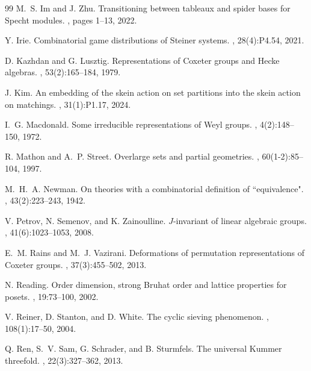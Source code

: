 \documentclass[11pt]{amsart}
\theoremstyle{plain}
\theoremstyle{definition}
\theoremstyle{remark}
\numberwithin{equation}{subsection}
\begin{document}
\begin{thebibliography}{99}
M.~S. Im and J. Zhu.
\newblock Transitioning between tableaux and spider bases for {S}pecht modules.
, pages 1--13, 2022.

Y. Irie.
\newblock Combinatorial game distributions of {S}teiner systems.
, 28(4):P4.54, 2021.

D. Kazhdan and G. Lusztig.
\newblock Representations of {C}oxeter groups and {H}ecke algebras.
, 53(2):165--184, 1979.

J. Kim.
\newblock An embedding of the skein action on set partitions into the skein
  action on matchings.
, 31(1):P1.17, 2024.


I.~G. Macdonald.
\newblock Some irreducible representations of {W}eyl groups.
, 4(2):148--150,
  1972.

R. Mathon and A.~P. Street.
\newblock Overlarge sets and partial geometries.
, 60(1-2):85--104, 1997.

M.~H.~A. Newman.
\newblock On theories with a combinatorial definition of ``equivalence".
, 43(2):223--243, 1942.

V. Petrov, N. Semenov, and K. Zainoulline.
\newblock ${J}$-invariant of linear algebraic groups.
,
  41(6):1023--1053, 2008.

E.~M. Rains and M.~J. Vazirani.
\newblock Deformations of permutation representations of {C}oxeter groups.
, 37(3):455--502, 2013.

N. Reading.
\newblock Order dimension, strong {B}ruhat order and lattice properties for
  posets.
, 19:73--100, 2002.

V. Reiner, D. Stanton, and D. White.
\newblock The cyclic sieving phenomenon.
, 108(1):17--50, 2004.

Q. Ren, S.~V. Sam, G. Schrader, and B. Sturmfels.
\newblock The universal {K}ummer threefold.
, 22(3):327--362, 2013.


\end{thebibliography}
\end{document}
